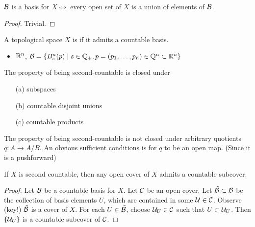 \begin{lemma}\label{lem:1.3}
    \(\mathcal{B}\) is a basis for \(X\iff\) every open set of \(X\) is a union of elements of \(\mathcal{B}\).
\end{lemma}

\begin{proof}
    Trivial.
\end{proof}

\begin{definition*}
    A topological space \(X\) is  if it admits a countable basis.
\end{definition*}

\begin{example}
    \begin{itemize}
        \item \(\mathbb{R}^n\), \(\mathcal{B}=\{B_s^n(p)\mid s\in \mathbb{Q}_+,p=(p_1,\dots,p_n)\in\mathbb{Q}^n\subset \mathbb{R}^n\}\)
    \end{itemize}
\end{example}

\begin{lemma}\label{lem:1.4}
    The property of being second-countable is closed under 
    \begin{enumerate}
        \item[(a)] subspaces
        \item[(b)] countable disjoint unions
        \item[(c)] countable products
    \end{enumerate}
\end{lemma}

\begin{remark}
    The property of being second-countable is not closed under arbitrary quotients \(q:A\to A/B\). 
    An obvious sufficient conditions is for \(q\) to be an open map. (Since it is a pushforward)
\end{remark}

\begin{lemma}\label{lem:1.5}
    If \(X\) is second countable, then any open cover of \(X\) admits a countable subcover.
\end{lemma}

\begin{proof}
    Let \(\mathcal{B}\) be a countable basis for \(X\). Let \(\mathcal{C}\) be an open cover. 
    Let \(\tilde{\mathcal{B}}\subset\mathcal{B}\) be the collection of basis elements \(U\), which are contained 
    in some \(\mathcal{U}\in\mathcal{C}\). Observe (key!) \(\tilde{\mathcal{B}}\) is a cover of \(X\). For each \(U\in\tilde{\mathcal{B}}\),
    choose \(\mathcal{U}_U\in\mathcal{C}\) such that \(U\subset \mathcal{U}_U\). Then \(\{\mathcal{U}_U\}\) is a countable subcover of \(\mathcal{C}\).
\end{proof}

